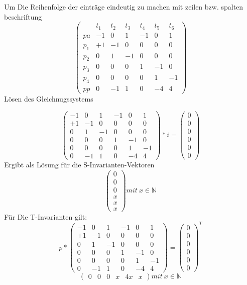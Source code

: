 Um Die Reihenfolge der einträge eindeutig zu machen mit zeilen bzw. spalten beschriftung
\[
\begin{pmatrix}
&t_1&t_2&t_3&t_4&t_5&t_6\\
pa&-1&0&1&-1&0&1  \\
p_1&+1&-1&0&0&0&0  \\
p_2&0&1&-1&0&0&0  \\
p_3&0&0&0&1&-1&0  \\
p_4&0&0&0&0&1&-1  \\
pp&0&-1&1&0&-4&4
\end{pmatrix}
\]
Lösen des Gleichnugssystems

\[
\begin{pmatrix}
-1&0&1&-1&0&1  \\
+1&-1&0&0&0&0  \\
0&1&-1&0&0&0  \\
0&0&0&1&-1&0  \\
0&0&0&0&1&-1  \\
0&-1&1&0&-4&4
\end{pmatrix}
*i=\begin{pmatrix}
0\\0\\0\\0\\0\\0
\end{pmatrix}
\]
Ergibt als Lösung für die S-Invarianten-Vektoren 
\[\begin{pmatrix}
0\\0\\0\\x\\x\\x
\end{pmatrix}mit\ x\in \mathbb{N}\]
Für Die T-Invarianten gilt:
\[
p*
\begin{pmatrix}
-1&0&1&-1&0&1  \\
+1&-1&0&0&0&0  \\
0&1&-1&0&0&0  \\
0&0&0&1&-1&0  \\
0&0&0&0&1&-1  \\
0&-1&1&0&-4&4
\end{pmatrix}
=\begin{pmatrix}
0\\0\\0\\0\\0\\0
\end{pmatrix}^T
\]
\[
\begin{pmatrix}
0&0&0&x&4x&x
\end{pmatrix} mit\ x\in \mathbb{N}\]